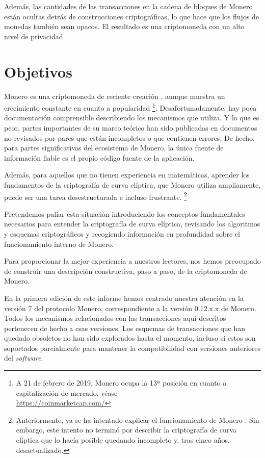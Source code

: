 Además, las cantidades de las transacciones en la cadena de bloques de Monero están ocultas detrás de construcciones criptográficas, lo que hace que los flujos de monedas también sean opacos. El resultado es una criptomoneda con un alto nivel de privacidad.


\section{Objetivos}
\label{sec:goals}

Monero es una criptomoneda de reciente creación \cite{bitmonero-launched, monero-history}, aunque muestra un crecimiento constante en cuanto a popularidad \footnote{\label{marketcap_note}A 21 de febrero de 2019, Monero ocupa la 13ª posición en cuanto a capitalización de mercado, véase \\ \url{https://coinmarketcap.com/}}. 
Desafortunadamente, hay poca documentación comprensible describiendo los mecanismos que utiliza. Y lo que es peor, partes importantes de su marco teórico han sido publicadas en documentos no revisados por pares que están incompletos o que contienen errores. De hecho, para partes significativas del ecosistema de Monero, la única fuente de información fiable es el propio código fuente de la aplicación.

Además, para aquellos que no tienen experiencia en matemáticas, aprender los fundamentos de la criptografía de curva elíptica, que Monero utiliza ampliamente, puede ser una tarea desestructurada e incluso frustrante. \footnote{Anteriormente, ya se ha intentado explicar el funcionamiento de Monero \cite{MRL-0003}. Sin embargo, este intento no terminó por describir la criptografía de curva elíptica que lo hacía posible quedando incompleto y, tras cinco años, desactualizado.}

Pretendemos paliar esta situación introduciendo los conceptos fundamentales necesarios para entender la criptografía de curva elíptica, revisando los algoritmos y esquemas criptográficos y recogiendo información en profundidad sobre el funcionamiento interno de Monero.

Para proporcionar la mejor experiencia a nuestros lectores, nos hemos preocupado de construir una descripción constructiva, paso a paso, de la criptomoneda de Monero.

En la primera edición de este informe hemos centrado nuestra atención en la versión 7 del protocolo Monero, correspondiente a la versión 0.12.x.x de Monero. Todos los mecanismos relacionados con las transacciones aquí descritos pertenecen de hecho a esas versiones. Los esquemas de transacciones que han quedado obsoletos no han sido explorados hasta el momento, incluso si estos son soportados parcialmente para mantener la compatibilidad con versiones anteriores del \textit{software}.


